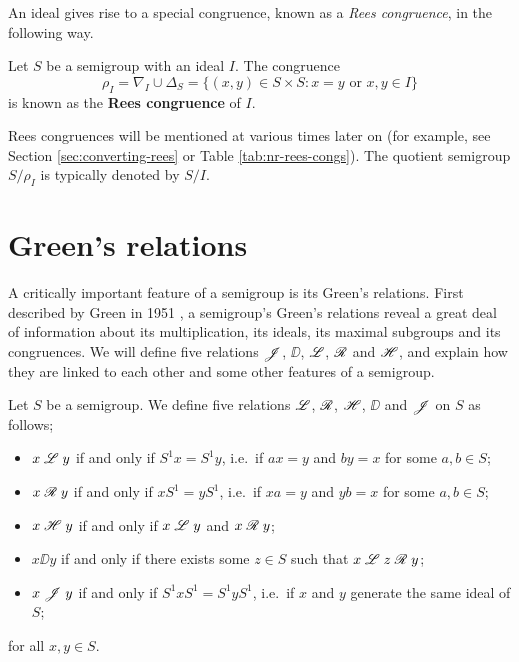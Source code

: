 An ideal gives rise to a special congruence, known as a \textit{Rees
  congruence}, in the following way.

\begin{definition}
  \label{def:rees-congruence}
  Let $S$ be a semigroup with an ideal $I$.  The congruence
  $$\rho_I = \nabla_I \cup \Delta_S
  = \{(x,y) \in S \times S : x=y \text{~or~} x,y \in I\}$$
  is known as the \textbf{Rees congruence} of $I$.
\end{definition}

Rees congruences will be mentioned at various times later on (for example, see
Section \ref{sec:converting-rees} or Table \ref{tab:nr-rees-congs}).  The
quotient semigroup $S / \rho_I$ is typically denoted by $S / I$.

\section{Green's relations}
\label{sec:intro-greens}

A critically important feature of a semigroup is its Green's relations.  First
described by Green in 1951 \cite{green}, a semigroup's Green's relations reveal
a great deal of information about its multiplication, its ideals, its maximal
subgroups and its congruences.  We will define five relations $\mathrel{\mathscr{J}}$, $\DD$,
$\mathrel{\mathscr{L}}$, $\mathrel{\mathscr{R}}$ and $\mathrel{\mathscr{H}}$, and explain how they are linked to each other and some
other features of a semigroup.

\begin{definition}
  \label{def:greens-relations}

  Let $S$ be a semigroup.  We define five relations $\mathrel{\mathscr{L}}$, $\mathrel{\mathscr{R}}$, $\mathrel{\mathscr{H}}$, $\DD$
  and $\mathrel{\mathscr{J}}$ on $S$ as follows;
  \begin{itemize}
  \item $x \mathrel{\mathscr{L}} y$ if and only if $S^1x = S^1y$, i.e.~if $ax=y$ and $by=x$ for
    some $a,b \in S$;
  \item $x \mathrel{\mathscr{R}} y$ if and only if $xS^1 = yS^1$, i.e.~if $xa=y$ and $yb=x$ for
    some $a,b \in S$;
  \item $x \mathrel{\mathscr{H}} y$ if and only if $x \mathrel{\mathscr{L}} y$ and $x \mathrel{\mathscr{R}} y$;
  \item $x \DD y$ if and only if there exists some $z \in S$ such that
    $x \mathrel{\mathscr{L}} z \mathrel{\mathscr{R}} y$;
  \item $x \mathrel{\mathscr{J}} y$ if and only if $S^1xS^1 = S^1yS^1$, i.e.~if $x$ and $y$
    generate the same ideal of $S$;
  \end{itemize}
  for all $x,y \in S$.
\end{definition}

